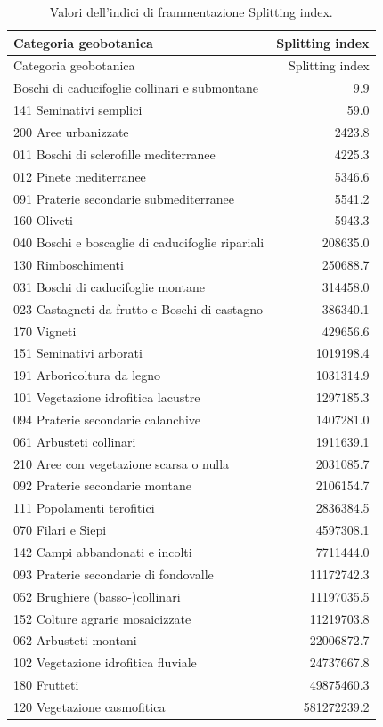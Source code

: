 \documentclass[
]{book}
\begin{document}
\begin{longtable}[]{@{}lr@{}}
\caption{\label{tab:SIAll} Valori dell'indici di frammentazione Splitting index.}\tabularnewline
\toprule\noalign{}
Categoria geobotanica & Splitting index \\
\midrule\noalign{}
\endfirsthead
\toprule\noalign{}
Categoria geobotanica & Splitting index \\
\midrule\noalign{}
\endhead
\bottomrule\noalign{}
\endlastfoot
022 Boschi di caducifoglie collinari e submontane & 9.9 \\
141 Seminativi semplici & 59.0 \\
200 Aree urbanizzate & 2423.8 \\
011 Boschi di sclerofille mediterranee & 4225.3 \\
012 Pinete mediterranee & 5346.6 \\
091 Praterie secondarie submediterranee & 5541.2 \\
160 Oliveti & 5943.3 \\
040 Boschi e boscaglie di caducifoglie ripariali & 208635.0 \\
130 Rimboschimenti & 250688.7 \\
031 Boschi di caducifoglie montane & 314458.0 \\
023 Castagneti da frutto e Boschi di castagno & 386340.1 \\
170 Vigneti & 429656.6 \\
151 Seminativi arborati & 1019198.4 \\
191 Arboricoltura da legno & 1031314.9 \\
101 Vegetazione idrofitica lacustre & 1297185.3 \\
094 Praterie secondarie calanchive & 1407281.0 \\
061 Arbusteti collinari & 1911639.1 \\
210 Aree con vegetazione scarsa o nulla & 2031085.7 \\
092 Praterie secondarie montane & 2106154.7 \\
111 Popolamenti terofitici & 2836384.5 \\
070 Filari e Siepi & 4597308.1 \\
142 Campi abbandonati e incolti & 7711444.0 \\
093 Praterie secondarie di fondovalle & 11172742.3 \\
052 Brughiere (basso-)collinari & 11197035.5 \\
152 Colture agrarie mosaicizzate & 11219703.8 \\
062 Arbusteti montani & 22006872.7 \\
102 Vegetazione idrofitica fluviale & 24737667.8 \\
180 Frutteti & 49875460.3 \\
120 Vegetazione casmofitica & 581272239.2 \\
\end{longtable}
\end{document}
